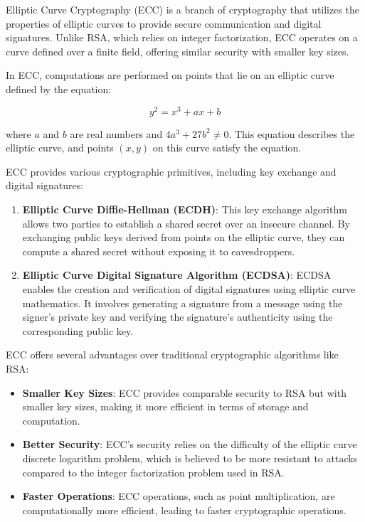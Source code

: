 \documentclass[11pt]{article}
\begin{document}
Elliptic Curve Cryptography (ECC) is a branch of cryptography that utilizes the properties of elliptic curves to provide secure communication and digital signatures. Unlike RSA, which relies on integer factorization, ECC operates on a curve defined over a finite field, offering similar security with smaller key sizes.

In ECC, computations are performed on points that lie on an elliptic curve defined by the equation:

\[ y^2 = x^3 + ax + b \]

where \( a \) and \( b \) are real numbers and \( 4a^3 + 27b^2 \neq 0 \). This equation describes the elliptic curve, and points \( (x, y) \) on this curve satisfy the equation.

ECC provides various cryptographic primitives, including key exchange and digital signatures:

\begin{enumerate}
    \item \textbf{Elliptic Curve Diffie-Hellman (ECDH)}: This key exchange algorithm allows two parties to establish a shared secret over an insecure channel. By exchanging public keys derived from points on the elliptic curve, they can compute a shared secret without exposing it to eavesdroppers.
    
    \item \textbf{Elliptic Curve Digital Signature Algorithm (ECDSA)}: ECDSA enables the creation and verification of digital signatures using elliptic curve mathematics. It involves generating a signature from a message using the signer's private key and verifying the signature's authenticity using the corresponding public key.
\end{enumerate}

ECC offers several advantages over traditional cryptographic algorithms like RSA:

\begin{itemize}
    \item \textbf{Smaller Key Sizes}: ECC provides comparable security to RSA but with smaller key sizes, making it more efficient in terms of storage and computation.
  
    \item \textbf{Better Security}: ECC's security relies on the difficulty of the elliptic curve discrete logarithm problem, which is believed to be more resistant to attacks compared to the integer factorization problem used in RSA.
  
    \item \textbf{Faster Operations}: ECC operations, such as point multiplication, are computationally more efficient, leading to faster cryptographic operations.
\end{itemize}
\end{document}

